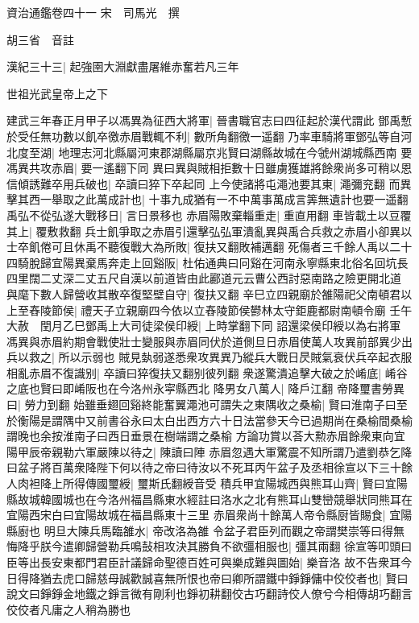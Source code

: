 資治通鑑卷四十一
宋　司馬光　撰

胡三省　音註

漢紀三十三|{
	起強圉大淵獻盡屠維赤奮若凡三年}


世祖光武皇帝上之下

建武三年春正月甲子以馮異為征西大將軍|{
	晉書職官志曰四征起於漢代謂此}
鄧禹慙於受任無功數以飢卒徼赤眉戰輒不利|{
	數所角翻徼一遥翻}
乃率車騎將軍鄧弘等自河北度至湖|{
	地理志河北縣屬河東郡湖縣屬京兆賢曰湖縣故城在今虢州湖城縣西南}
要馮異共攻赤眉|{
	要一遙翻下同}
異曰異與賊相拒數十日雖虜獲雄將餘衆尚多可稍以恩信傾誘難卒用兵破也|{
	卒讀曰猝下卒起同}
上今使諸將屯澠池要其東|{
	澠彌兖翻}
而異擊其西一舉取之此萬成計也|{
	十事九成猶有一不中萬事萬成言筭無遺計也要一遥翻}
禹弘不從弘遂大戰移日|{
	言日景移也}
赤眉陽敗棄輜重走|{
	重直用翻}
車皆載土以豆覆其上|{
	覆敷救翻}
兵士飢爭取之赤眉引還擊弘弘軍潰亂異與禹合兵救之赤眉小卻異以士卒飢倦可且休禹不聽復戰大為所敗|{
	復扶又翻敗補邁翻}
死傷者三千餘人禹以二十四騎脫歸宜陽異棄馬奔走上回谿阪|{
	杜佑通典曰冋谿在河南永寧縣東北俗名回坑長四里闊二丈深二丈五尺自漢以前道皆由此酈道元云曹公西討惡南路之險更開北道}
與麾下數人歸營收其散卒復堅壁自守|{
	復扶又翻}
辛巳立四親廟於雒陽祀父南頓君以上至舂陵節侯|{
	禮天子立親廟四今依以立舂陵節侯鬰林太守鉅鹿都尉南頓令廟}
壬午大赦　閏月乙巳鄧禹上大司徒梁侯印綬|{
	上時掌翻下同}
詔還梁侯印綬以為右將軍　馮異與赤眉約期會戰使壯士變服與赤眉同伏於道側旦日赤眉使萬人攻異前部異少出兵以救之|{
	所以示弱也}
賊見埶弱遂悉衆攻異異乃縱兵大戰日昃賊氣衰伏兵卒起衣服相亂赤眉不復識别|{
	卒讀曰猝復扶又翻别彼列翻}
衆遂驚潰追擊大破之於崤底|{
	崤谷之底也賢曰即崤阪也在今洛州永寜縣西北}
降男女八萬人|{
	降戶江翻}
帝降璽書勞異曰|{
	勞力到翻}
始雖垂翅回谿終能奮翼澠池可謂失之東隅收之桑榆|{
	賢曰淮南子曰至於衡陽是謂隅中又前書谷永曰太白出西方六十日法當參天今已過期尚在桑榆間桑榆謂晚也余按淮南子曰西日垂景在樹端謂之桑榆}
方論功賞以荅大勲赤眉餘衆東向宜陽甲辰帝親勒六軍嚴陳以待之|{
	陳讀曰陣}
赤眉忽遇大軍驚震不知所謂乃遣劉恭乞降曰盆子將百萬衆降陛下何以待之帝曰待汝以不死耳丙午盆子及丞相徐宣以下三十餘人肉袒降上所得傳國璽綬|{
	璽斯氏翻綬音受}
積兵甲宜陽城西與熊耳山齊|{
	賢曰宜陽縣故城韓國城也在今洛州福昌縣東水經註曰洛水之北有熊耳山雙巒競舉狀同熊耳在宜陽西宋白曰宜陽故城在福昌縣東十三里}
赤眉衆尚十餘萬人帝令縣厨皆賜食|{
	宜陽縣廚也}
明旦大陳兵馬臨雒水|{
	帝改洛為雒}
令盆子君臣列而觀之帝謂樊崇等曰得無悔降乎朕今遣卿歸營勒兵鳴鼔相攻決其勝負不欲彊相服也|{
	彊其兩翻}
徐宣等叩頭曰臣等出長安東都門君臣計議歸命聖德百姓可與樂成難與圖始|{
	樂音洛}
故不告衆耳今日得降猶去虎口歸慈母誠歡誠喜無所恨也帝曰卿所謂鐵中錚錚傭中佼佼者也|{
	賢曰說文曰錚錚金地鐵之錚言微有剛利也錚初耕翻佼古巧翻詩佼人僚兮今相傳胡巧翻言佼佼者凡庸之人稍為勝也}
